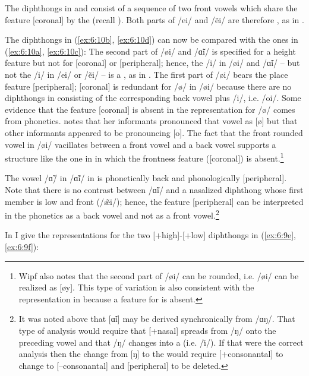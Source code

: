 The diphthongs in  and  consist of a sequence of two front vowels which share the feature [coronal] by the  (recall ). Both parts of /ei/ and /ẽi/ are therefore , as in .

The diphthongs in (\ref{ex:6:10b}, \ref{ex:6:10d}) can now be compared with the ones in (\ref{ex:6:10a}, \ref{ex:6:10c}): The second part of /øi/ and /\~ɑi/ is specified for a height feature but not for [coronal] or [peripheral]; hence, the /i/ in /øi/ and /\~ɑi/ -- but not the /i/ in /ei/ or /ẽi/ -- is a , as in . The first part of /øi/ bears the place feature [peripheral]; [coronal] is redundant for /ø/ in /øi/ because there are no diphthongs in  consisting of the corresponding back vowel plus /i/, i.e. /oi/. Some evidence that the feature [coronal] is absent in the representation for /ø/ comes from phonetics. \citet[11--12]{Wipf1910} notes that her informants pronounced that vowel as [ø] but that other informants appeared to be pronouncing [o]. The fact that the front rounded vowel in /øi/ vacillates between a front vowel and a back vowel supports a structure like the one in  in which the frontness feature ([coronal]) is absent.\footnote{Wipf also notes that the second part of /øi/ can be rounded, i.e. /øi/ can be realized as [øy]. This type of variation is also consistent with the representation in  because a feature for  is absent.}\largerpage

The vowel /\~ɑ/ in /\~ɑi/ in  is phonetically back and phonologically [peripheral]. Note that there is no contrast between /\~ɑi/ and a nasalized diphthong whose first member is low and front (/\~{æ}i/); hence, the feature [peripheral] can be interpreted in the phonetics as a back vowel and not as a front vowel.\footnote{It was noted above that [\~ɑi] may be derived synchronically from /ɑŋ/. That type of analysis would require that [+nasal] spreads from /ŋ/ onto the preceding vowel and that /ŋ/ changes into a  (i.e. /\~\i/). If that were the correct analysis then the change from [ŋ] to the  would require [+consonantal] to change to [--consonantal] and [peripheral] to be deleted.}

In  I give the representations for the two [+high]-[+low] diphthongs in (\ref{ex:6:9e}, \ref{ex:6:9f}):

